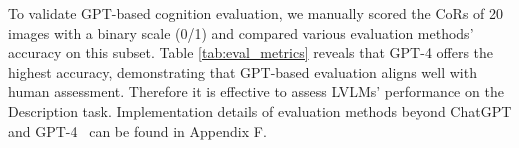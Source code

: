 To validate GPT-based cognition evaluation, we manually scored the CoRs of 20 images with a binary scale (0/1) and compared various evaluation methods' accuracy on this subset. 
Table \ref{tab:eval_metrics} reveals that GPT-4 offers the highest accuracy, demonstrating that GPT-based evaluation aligns well with human assessment. 
Therefore it is effective to assess LVLMs' performance on the Description task. 
Implementation details of evaluation methods beyond ChatGPT and GPT-4~\citep{lin2004rouge, bertscore, sellam2020bleurt, he2021deberta, yin-etal-2021-docnli} can be found in Appendix F. %





